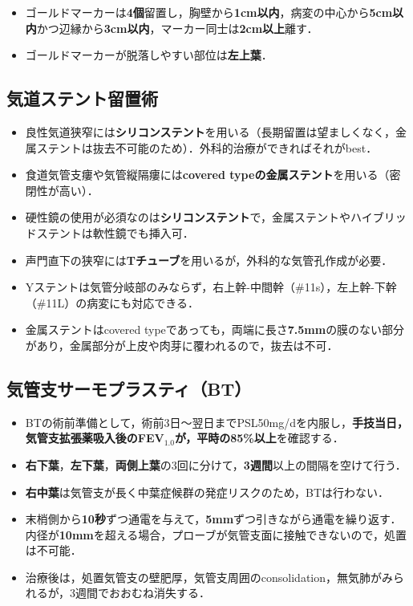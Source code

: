 \begin{itemize}
\item ゴールドマーカーは\textbf{4個}留置し，胸壁から\textbf{1cm以内}，病変の中心から\textbf{5cm以内}かつ辺縁から\textbf{3cm以内}，マーカー同士は\textbf{2cm以上}離す．
\item ゴールドマーカーが脱落しやすい部位は\textbf{左上葉}．

\end{itemize}

\subsection{気道ステント留置術}
\begin{itemize}

\item 良性気道狭窄には\textbf{シリコンステント}を用いる（長期留置は望ましくなく，金属ステントは抜去不可能のため）．外科的治療ができればそれがbest．
\item 食道気管支瘻や気管縦隔瘻には\textbf{covered typeの金属ステント}を用いる（密閉性が高い）．
\item 硬性鏡の使用が必須なのは\textbf{シリコンステント}で，金属ステントやハイブリッドステントは軟性鏡でも挿入可．
\item 声門直下の狭窄には\textbf{Tチューブ}を用いるが，外科的な気管孔作成が必要．
\item Yステントは気管分岐部のみならず，右上幹-中間幹（\#11s），左上幹-下幹（\#11L）の病変にも対応できる．
\item 金属ステントはcovered typeであっても，両端に長さ\textbf{7.5mm}の膜のない部分があり，金属部分が上皮や肉芽に覆われるので，抜去は不可．

\end{itemize}

\subsection{気管支サーモプラスティ（BT）}
\begin{itemize}
\item BTの術前準備として，術前3日〜翌日までPSL50mg/dを内服し，\textbf{手技当日，気管支拡張薬吸入後のFEV$_{1.0}$が，平時の85\%以上}を確認する．
\item \textbf{右下葉}，\textbf{左下葉}，\textbf{両側上葉}の3回に分けて，\textbf{3週間}以上の間隔を空けて行う．
\item \textbf{右中葉}は気管支が長く中葉症候群の発症リスクのため，BTは行わない．
\item 末梢側から\textbf{10秒}ずつ通電を与えて，\textbf{5mm}ずつ引きながら通電を繰り返す．内径が\textbf{10mm}を超える場合，プローブが気管支面に接触できないので，処置は不可能．
\item 治療後は，処置気管支の壁肥厚，気管支周囲のconsolidation，無気肺がみられるが，3週間でおおむね消失する．
\end{itemize}


